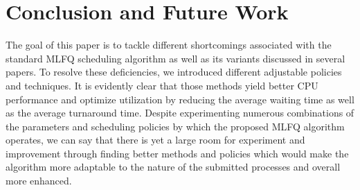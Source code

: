 \documentclass[conference]{IEEEtran}
\begin{document}

\section{Conclusion and Future Work}

The goal of this paper is to tackle different shortcomings associated with the standard MLFQ scheduling algorithm as well as its variants discussed in several papers. To resolve these deficiencies, we introduced different adjustable policies and techniques. It is evidently clear that those methods yield better CPU performance and optimize utilization by reducing the average waiting time as well as the average turnaround time. Despite experimenting numerous combinations of the parameters and scheduling policies by which the proposed MLFQ algorithm operates, we can say that there is yet a large room for experiment and improvement through finding better methods and policies which would make the algorithm more adaptable to the nature of the submitted processes and overall more enhanced.

\end{document}
